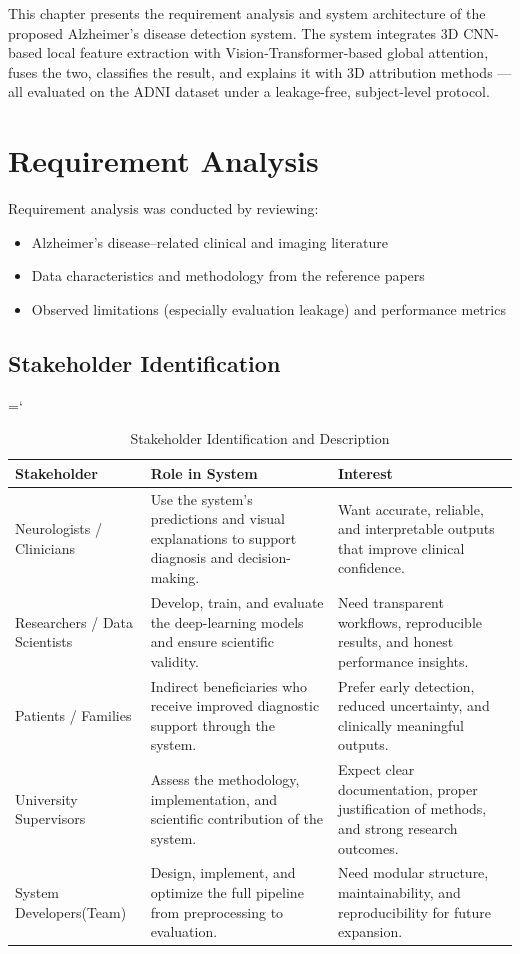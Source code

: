 This chapter presents the requirement analysis and system architecture of the proposed Alzheimer's disease detection system. The system integrates 3D CNN-based local feature extraction with Vision-Transformer-based global attention, fuses the two, classifies the result, and explains it with 3D attribution methods --- all evaluated on the ADNI dataset under a leakage-free, subject-level protocol.

\section{Requirement Analysis}
Requirement analysis was conducted by reviewing:
\begin{itemize}
    \item Alzheimer's disease--related clinical and imaging literature
    \item Data characteristics and methodology from the reference papers
    \item Observed limitations (especially evaluation leakage) and performance metrics
\end{itemize}

\newpage
\subsection{Stakeholder Identification}
\begin{sloppypar}
\hyphenchar\font=`\-
\begin{longtable}{|p{4cm}|p{5.5cm}|p{5cm}|}
\caption{Stakeholder Identification and Description}\\
\hline
\textbf{Stakeholder} & \textbf{Role in System} & \textbf{Interest}\\
\hline
Neurologists / Clinicians & Use the system's predictions and visual explanations to support diagnosis and decision-making. & Want accurate, reliable, and interpretable outputs that improve clinical confidence.\\
\hline
Researchers / Data Scientists & Develop, train, and evaluate the deep-learning models and ensure scientific validity. & Need transparent workflows, reproducible results, and honest performance insights.\\
\hline
Patients / Families & Indirect beneficiaries who receive improved diagnostic support through the system. & Prefer early detection, reduced uncertainty, and clinically meaningful outputs.\\
\hline
University Supervisors & Assess the methodology, implementation, and scientific contribution of the system. & Expect clear documentation, proper justification of methods, and strong research outcomes.\\
\hline
System Developers(Team) & Design, implement, and optimize the full pipeline from preprocessing to evaluation. & Need modular structure, maintainability, and reproducibility for future expansion.\\
\hline
\end{longtable}
\end{sloppypar}

